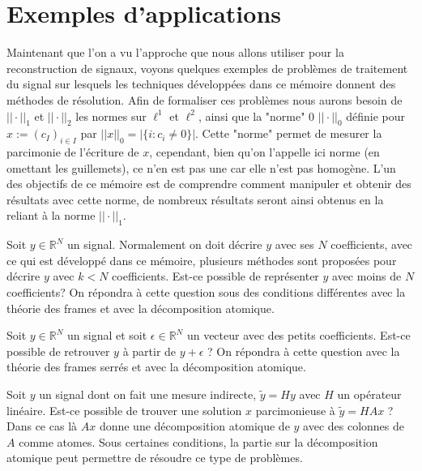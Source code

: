 \section{Exemples d'applications}
Maintenant que l'on a vu l'approche que nous allons utiliser pour la reconstruction de signaux, voyons quelques exemples de problèmes de traitement du signal sur lesquels les techniques développées dans ce mémoire donnent des méthodes de résolution.
Afin de formaliser ces problèmes nous aurons besoin de $||\cdot||_1$ et $||\cdot||_2$ les normes sur $\ell^1$ et $\ell^2$, ainsi que la "norme" 0 $||\cdot||_0$ définie pour $x:=(c_I)_{i\in I}$ par  $||x||_0 = |\{i: c_i \neq 0\}|$. 
Cette "norme" permet de mesurer la parcimonie de l'écriture de $x$, cependant, bien qu'on l'appelle ici norme (en omettant les guillemets), ce n'en est pas une car elle n'est pas homogène.
L'un des objectifs de ce mémoire est de comprendre comment manipuler et obtenir des résultats avec cette norme, de nombreux résultats seront ainsi obtenus en la reliant à la norme $||\cdot||_1$.
\begin{exemple}[Compression]
	Soit $y \in \mathbb{R}^N$ un signal. Normalement on doit décrire $y$ avec ses $N$ coefficients, avec ce qui est développé dans ce mémoire, plusieurs méthodes sont proposées pour décrire $y$ avec $k<N$ coefficients.
	Est-ce possible de représenter $y$ avec moins de $N$ coefficients?
	\newline
	On répondra à cette question sous des conditions différentes avec la théorie des frames et avec la décomposition atomique.
\end{exemple}	
\begin{exemple}[Débruitage]
	Soit $y \in \mathbb{R}^N$ un signal et soit $\epsilon \in \mathbb{R}^N$ un vecteur avec des petits coefficients.
	Est-ce possible de retrouver $y$ à partir de $y+\epsilon$ ?
	\newline
	On répondra à cette question avec la théorie des frames serrés et avec la décomposition atomique.
\end{exemple}
\begin{exemple}
	Soit $y$ un signal dont on fait une mesure indirecte, $\tilde{y} = Hy$ avec $H$ un opérateur linéaire. 
	Est-ce possible de trouver une solution $x$ parcimonieuse à $\tilde{y} = HAx$ ?
	\newline
	Dans ce cas là $Ax$ donne une décomposition atomique de $y$ avec des colonnes de $A$ comme atomes. Sous certaines conditions, la partie sur la décomposition atomique peut permettre de résoudre ce type de problèmes.
\end{exemple}
